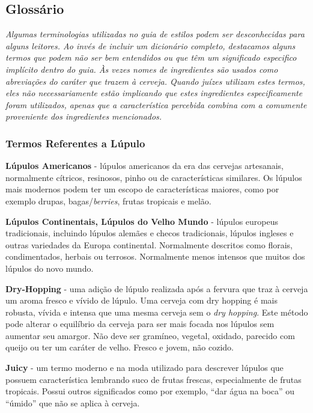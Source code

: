 \subsection*{Glossário}
\textit{Algumas terminologias utilizadas no guia de estilos podem ser desconhecidas para alguns leitores. Ao invés de incluir um dicionário completo, destacamos alguns termos que podem não ser bem entendidos ou que têm um significado especifico implícito dentro do guia. Às vezes nomes de ingredientes são usados como abreviações do caráter que trazem à cerveja. Quando juízes utilizam estes termos, eles não necessariamente estão implicando que estes ingredientes especificamente foram utilizados, apenas que a característica percebida combina com a comumente proveniente dos ingredientes mencionados.}
\subsubsection*{Termos Referentes a Lúpulo}
\textbf{Lúpulos Americanos} - lúpulos americanos da era das cervejas artesanais, normalmente cítricos, resinosos, pinho ou de características similares. Os lúpulos mais modernos podem ter um escopo de características maiores, como por exemplo drupas, bagas/\textit{berries}, frutas tropicais e melão.

\textbf{Lúpulos Continentais, Lúpulos do Velho Mundo} - lúpulos europeus tradicionais, incluindo lúpulos alemães e checos tradicionais, lúpulos ingleses e outras variedades da Europa continental. Normalmente descritos como florais, condimentados, herbais ou terrosos. Normalmente menos intensos que muitos dos lúpulos do novo mundo.

\textbf{Dry-Hopping} - uma adição de lúpulo realizada após a fervura que traz à cerveja um aroma fresco e vívido de lúpulo. Uma cerveja com dry hopping é mais robusta, vívida e intensa que uma mesma cerveja sem o \textit{dry hopping}. Este método pode alterar o equilíbrio da cerveja para ser mais focada nos lúpulos sem aumentar seu amargor. Não deve ser gramíneo, vegetal, oxidado, parecido com queijo ou ter um caráter de velho. Fresco e jovem, não cozido.

\textbf{Juicy} - um termo moderno e na moda utilizado para descrever lúpulos que possuem característica lembrando suco de frutas frescas, especialmente de frutas tropicais. Possui outros significados como por exemplo, “dar água na boca” ou “úmido” que não se aplica à cerveja.

